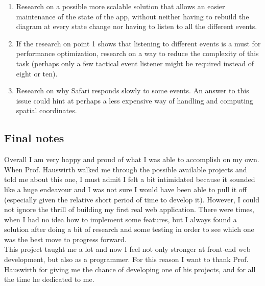 \documentclass[]{usiinfbachelorproject}
\begin{document}
\begin{enumerate}
	\item Research on a possible more scalable solution that allows an easier maintenance of the state of the app, without neither having to rebuild the diagram at every state change nor having to listen to all the different events.
	\item If the research on point 1 shows that listening to different events is a must for performance optimization, research on a way to reduce the complexity of this task (perhaps only a few tactical event listener might be required instead of eight or ten).
	\item Research on why Safari responds slowly to some events. An answer to this issue could hint at perhaps a less expensive way of handling and computing spatial coordinates.
\end{enumerate}

\subsection{Final notes}

Overall I am very happy and proud of what I was able to accomplish on my own. When Prof. Hauswirth walked me through the possible available projects and told me about this one, I must admit I felt a bit intimidated because it sounded like a huge endeavour and I was not sure I would have been able to pull it off (especially given the relative short period of time to develop it). However, I could not ignore the thrill of building my first real web application. There were times, when I had no idea how to implement some features, but I always found a solution after doing a bit of research and some testing in order to see which one was the best move to progress forward.\\
This project taught me a lot and now I feel not only stronger at front-end web development, but also as a programmer. For this reason I want to thank Prof. Hauswirth for giving me the chance of developing one of his projects, and for all the time he dedicated to me.

\vspace{\fill}

\pagebreak



\end{document}

